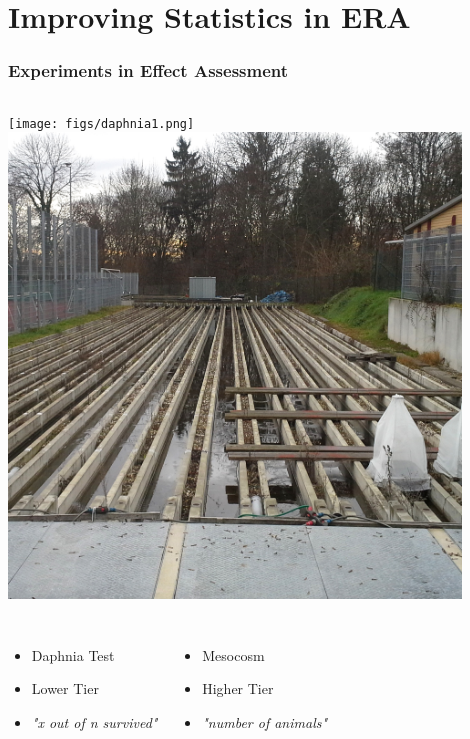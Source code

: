 \documentclass[10pt
	]{beamer}
\begin{document}
\section{Improving Statistics in ERA}

{%
\begin{frame}
\frametitle{Experiments in Effect Assessment}
	\begin{columns}[T]
		\texttt{[image: figs/daphnia1.png]}
	\column<2->{.49\textwidth}
		\includegraphics[width=0.9\textwidth]{figs/mesocosm_ld.jpg}
	\end{columns}

	\vfill
	\begin{columns}[T]
		\begin{itemize}
			\item Daphnia Test
			\item Lower Tier 
			\item \emph{"x out of n survived"}
		\end{itemize}

		\begin{itemize}
			\item Mesocosm
			\item Higher Tier 
			\item \emph{"number of animals"}
		\end{itemize}
	\end{columns}
\end{frame}
}%
\end{document}
